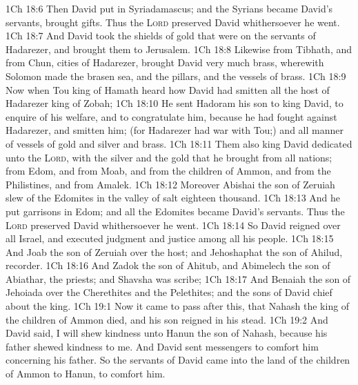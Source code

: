 \vs 1Ch 18:6 Then David put  in Syriadamascus; and the Syrians became David's servants,  brought gifts. Thus the \textsc{Lord} preserved David whithersoever he went.
\vs 1Ch 18:7 And David took the shields of gold that were on the servants of Hadarezer, and brought them to Jerusalem.
\vs 1Ch 18:8 Likewise from Tibhath, and from Chun, cities of Hadarezer, brought David very much brass, wherewith Solomon made the brasen sea, and the pillars, and the vessels of brass.
\vs 1Ch 18:9 Now when Tou king of Hamath heard how David had smitten all the host of Hadarezer king of Zobah;
\vs 1Ch 18:10 He sent Hadoram his son to king David, to enquire of his welfare, and to congratulate him, because he had fought against Hadarezer, and smitten him; (for Hadarezer had war with Tou;) and  all manner of vessels of gold and silver and brass.
\vs 1Ch 18:11 Them also king David dedicated unto the \textsc{Lord}, with the silver and the gold that he brought from all  nations; from Edom, and from Moab, and from the children of Ammon, and from the Philistines, and from Amalek.
\vs 1Ch 18:12 Moreover Abishai the son of Zeruiah slew of the Edomites in the valley of salt eighteen thousand.
\vs 1Ch 18:13 And he put garrisons in Edom; and all the Edomites became David's servants. Thus the \textsc{Lord} preserved David whithersoever he went.
\vs 1Ch 18:14 So David reigned over all Israel, and executed judgment and justice among all his people.
\vs 1Ch 18:15 And Joab the son of Zeruiah  over the host; and Jehoshaphat the son of Ahilud, recorder.
\vs 1Ch 18:16 And Zadok the son of Ahitub, and Abimelech the son of Abiathar,  the priests; and Shavsha was scribe;
\vs 1Ch 18:17 And Benaiah the son of Jehoiada  over the Cherethites and the Pelethites; and the sons of David  chief about the king.
\vs 1Ch 19:1 Now it came to pass after this, that Nahash the king of the children of Ammon died, and his son reigned in his stead.
\vs 1Ch 19:2 And David said, I will shew kindness unto Hanun the son of Nahash, because his father shewed kindness to me. And David sent messengers to comfort him concerning his father. So the servants of David came into the land of the children of Ammon to Hanun, to comfort him.

